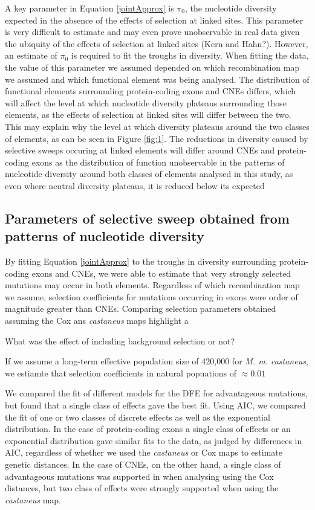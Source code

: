 	A key parameter in Equation \ref{jointApprox} is $\pi_0$, the nucleotide diversity expected in the absence of the effects of selection at linked sites. This parameter is very difficult to estimate and may even prove unobservable in real data given the ubiquity of the effects of selection at linked sites (Kern and Hahn?). However, an estimate of $\pi_0$ is required to fit the troughs in diversity. When fitting the data, the value of this parameter we assumed depended on which recombination map we assumed and which functional element was being analysed. The distribution of functional elements surrounding protein-coding exons and CNEs differs, which will affect the level at which nucleotide diversity plateaus surrounding those elements, as the effects of selection at linked sites will differ between the two. This may explain why the level at which diversity plateaus around the two classes of elements, as can be seen in Figure \ref{fig:1}.
	The reductions in diversity caused by selective sweeps occuring at linked elements will differ around CNEs and protein-coding exons as the distribution of function
	unobservable in the patterns of nucleotide diversity around both classes of elements analysed in this study, as even where neutral diversity plateaus, it is reduced below its expected 

\subsection{Parameters of selective sweep obtained from patterns of nucleotide diversity}

	By fitting Equation \ref{jointApprox} to the troughs in diversity surrounding protein-coding exons and CNEs, we were able to estimate that very strongly selected mutations may occur in both elements. Regardless of which recombination map we assume, selection coefficients for mutations occurring in exons were order of magnitude greater than CNEs. Comparing selection parameters obtained assuming the Cox ans \textit{castaneus} maps highlight a 

	What was the effect of including background selection or not?
	
	If we assume a long-term effective population size of 420,000 for \textit{M. m. castaneus}, we estiamte that selection coefficients in natural popuations of $\approx 0.01$


	We compared the fit of different models for the DFE for advantageous mutations, but found that a single class of effects gave the best fit. Using AIC, we compared the fit of one or two classes of discrete effects as well as the exponential distribution. In the case of protein-coding exons a single class of effects or an exponential distribution gave similar fits to the data, as judged by differences in AIC, regardless of whether we used the \textit{castaneus} or Cox maps to estimate genetic distances. In the case of CNEs, on the other hand, a single class of advantageous mutations was supported in when analysing using the Cox distances, but two class of effects were strongly supported when using the \textit{castaneus} map. 

